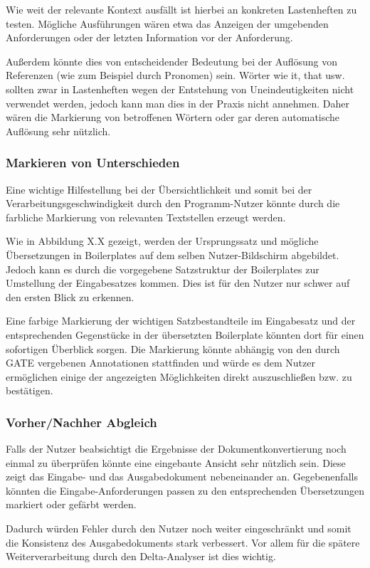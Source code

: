 \documentclass[12pt]{report}
\begin{document}
Wie weit der relevante Kontext ausfällt ist hierbei an konkreten Lastenheften zu testen. Mögliche Ausführungen wären etwa das Anzeigen der umgebenden Anforderungen oder der letzten Information vor der Anforderung.  

Außerdem könnte dies von entscheidender Bedeutung bei der Auflösung von Referenzen (wie zum Beispiel durch Pronomen) sein. Wörter wie \glqq it\grqq{}, \glqq that\grqq{} usw. sollten zwar in Lastenheften wegen der Entstehung von Uneindeutigkeiten nicht verwendet werden, jedoch kann man dies in der Praxis nicht annehmen. Daher wären die Markierung von betroffenen Wörtern oder gar deren automatische Auflösung sehr nützlich.

\subsubsection{Markieren von Unterschieden}
Eine wichtige Hilfestellung bei der Übersichtlichkeit und somit bei der Verarbeitungsgeschwindigkeit durch den Programm-Nutzer könnte durch die farbliche Markierung von relevanten Textstellen erzeugt werden.
 
Wie in Abbildung X.X gezeigt, werden der Ursprungssatz und mögliche Übersetzungen in Boilerplates auf dem selben Nutzer-Bildschirm abgebildet. Jedoch kann es durch die vorgegebene Satzstruktur der Boilerplates zur Umstellung der Eingabesatzes kommen. Dies ist für den Nutzer nur schwer auf den ersten Blick zu erkennen.

Eine farbige Markierung der wichtigen Satzbestandteile im Eingabesatz und der entsprechenden Gegenstücke in der übersetzten Boilerplate könnten dort für einen sofortigen Überblick sorgen. Die Markierung könnte abhängig von den durch GATE vergebenen Annotationen stattfinden und würde es dem Nutzer ermöglichen einige der angezeigten Möglichkeiten direkt auszuschließen bzw. zu bestätigen.

\subsubsection{Vorher/Nachher Abgleich}
Falls der Nutzer beabsichtigt die Ergebnisse der Dokumentkonvertierung noch einmal zu überprüfen könnte eine eingebaute Ansicht sehr nützlich sein. Diese zeigt das Eingabe- und das Ausgabedokument nebeneinander an. Gegebenenfalls könnten die Eingabe-Anforderungen passen zu den entsprechenden Übersetzungen markiert oder gefärbt werden. 

Dadurch würden Fehler durch den Nutzer noch weiter eingeschränkt und somit die Konsistenz des Ausgabedokuments stark verbessert. Vor allem für die spätere Weiterverarbeitung durch den Delta-Analyser ist dies wichtig. 
\end{document}
